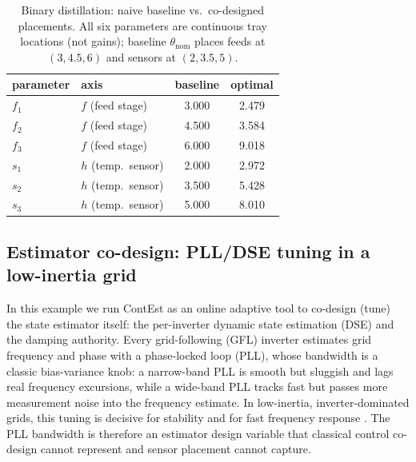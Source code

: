 \documentclass[twocolumn,amsthm]{autart}
\begin{document}
\begin{table}[t]
\centering
\caption{Binary distillation: naive baseline vs.\ co-designed placements. All six
parameters are continuous tray locations (not gains); baseline $\theta_{\mathrm{nom}}$
places feeds at $(3,4.5,6)$ and sensors at $(2,3.5,5)$.}
\label{tab:distill}
\begin{tabular}{llcc}
\hline
parameter & axis & baseline & optimal \\
\hline
$f_1$ & $f$ (feed stage)    & 3.000 & 2.479 \\
$f_2$ & $f$ (feed stage)    & 4.500 & 3.584 \\
$f_3$ & $f$ (feed stage)    & 6.000 & 9.018 \\
$s_1$ & $h$ (temp.\ sensor) & 2.000 & 2.972 \\
$s_2$ & $h$ (temp.\ sensor) & 3.500 & 5.428 \\
$s_3$ & $h$ (temp.\ sensor) & 5.000 & 8.010 \\
\hline
\end{tabular}
\end{table}

\subsection{Estimator co-design: PLL/DSE tuning in a low-inertia grid}
\label{sec:sim:pll}

In this example we run ContEst as an online adaptive tool to co-design (tune) the state estimator itself: the per-inverter
dynamic state estimation (DSE) and the damping authority. Every
grid-following (GFL) inverter estimates grid frequency and phase with a
phase-locked loop (PLL), whose bandwidth is a classic bias-variance knob: a
narrow-band PLL is smooth but sluggish and lags real frequency excursions, while
a wide-band PLL tracks fast but passes more measurement noise into the frequency
estimate. In low-inertia, inverter-dominated grids, this tuning is decisive
for stability and for fast frequency response \cite{zhao2019power}. The PLL
bandwidth is therefore an estimator design variable that classical control
co-design cannot represent and sensor placement cannot capture.
\end{document}
